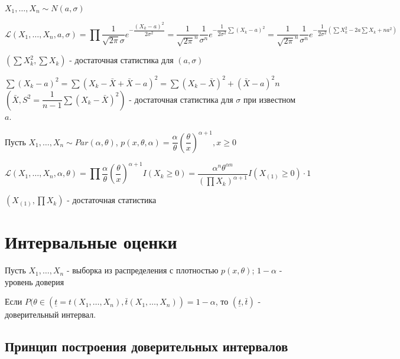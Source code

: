 \begin{ex}
  $X_1, \dots, X_n \sim N(a, \sigma)$

  \[
    \mathcal{L} (X_1, \dots, X_n, a, \sigma) = \prod \dfrac{1}{\sqrt{2\pi} \sigma} e^{-\dfrac{(X_k-a)^2}{2\sigma^2}} = \dfrac{1}{\sqrt{2\pi}^n} \dfrac{1}{\sigma^n} e^{-\dfrac{1}{2\sigma^2} \sum (X_k-a)^2} = \dfrac{1}{\sqrt{2\pi}^n} \dfrac{1}{\sigma^n} e^{-\dfrac{1}{2\sigma^2} (\sum X_k^2 - 2a \sum X_k + na^2)}
  \]

  $(\sum X_k^2, \sum X_k)$ - достаточная статистика для $(a, \sigma)$

  $\sum (X_k-a)^2 = \sum (X_k - \bar X + \bar X - a)^2 = \sum (X_k-\bar X)^2 + (\bar X - a)^2 n$
  $(\bar X, S^2 = \dfrac{1}{n-1} \sum (X_k-\bar X)^2)$ - достаточная статистика для $\sigma$ при известном $a$.
\end{ex}

\begin{ex}
  Пусть $X_1, \dots, X_n \sim Par(\alpha, \theta)$,
  $p(x, \theta, \alpha) = \dfrac{\alpha}{\theta} \left(\dfrac{\theta}{x}\right)^{\alpha+1}, x\geqslant 0$

  \[
    \mathcal{L} (X_1, \dots, X_n, \alpha, \theta) = \prod \dfrac{\alpha}{\theta} (\dfrac{\theta}{x})^{\alpha+1} I(X_k \geqslant 0) = \dfrac{\alpha^n \theta^{\alpha n}}{(\prod X_k)^{\alpha+1}} I(X_{(1)}\geqslant 0) \cdot 1
  \]

  $(X_{(1)}, \prod X_k)$ - достаточная статистика
\end{ex}

\section{Интервальные оценки}

Пусть $X_1, \dots, X_n$ - выборка из распределения с плотностью $p(x, \theta)$; $1-\alpha$ - уровень доверия

\begin{definition}
  Если $P(\theta \in (\underline{t} = t(X_1, \dots, X_n), \bar t(X_1, \dots, X_n)) = 1-\alpha$, то $(\underline{t}, \bar t)$ - доверительный интервал.
\end{definition}

\subsection{Принцип построения доверительных интервалов}

